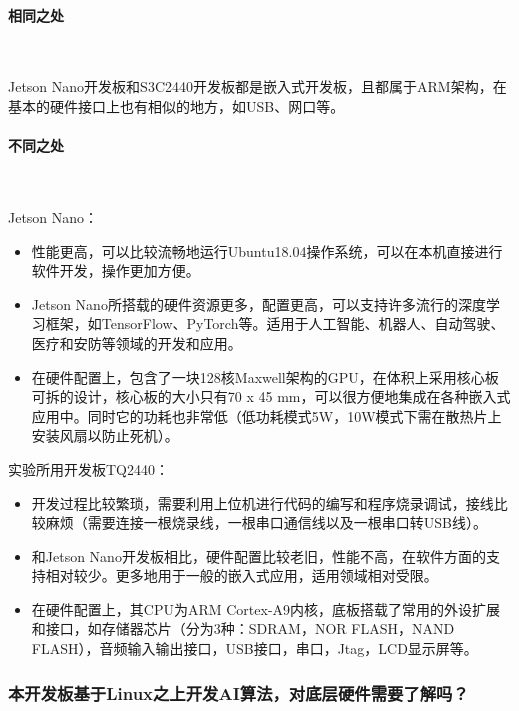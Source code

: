 \documentclass[UTF8]{article}
\begin{document}
\paragraph{相同之处}~{}

Jetson Nano开发板和S3C2440开发板都是嵌入式开发板，且都属于ARM架构，在基本的硬件接口上也有相似的地方，如USB、网口等。

\paragraph{不同之处}~{}

\noindent Jetson Nano：
\begin{itemize}
    \item 性能更高，可以比较流畅地运行Ubuntu18.04操作系统，可以在本机直接进行软件开发，操作更加方便。
    \item Jetson Nano所搭载的硬件资源更多，配置更高，可以支持许多流行的深度学习框架，如TensorFlow、PyTorch等。适用于人工智能、机器人、自动驾驶、医疗和安防等领域的开发和应用。
    \item 在硬件配置上，包含了一块128核Maxwell架构的GPU，在体积上采用核心板可拆的设计，核心板的大小只有70 x 45 mm，可以很方便地集成在各种嵌入式应用中。同时它的功耗也非常低（低功耗模式5W，10W模式下需在散热片上安装风扇以防止死机）。
\end{itemize}


\noindent 实验所用开发板TQ2440：
\begin{itemize}
    \item 开发过程比较繁琐，需要利用上位机进行代码的编写和程序烧录调试，接线比较麻烦（需要连接一根烧录线，一根串口通信线以及一根串口转USB线）。
    \item 和Jetson Nano开发板相比，硬件配置比较老旧，性能不高，在软件方面的支持相对较少。更多地用于一般的嵌入式应用，适用领域相对受限。
    \item 在硬件配置上，其CPU为ARM Cortex-A9内核，底板搭载了常用的外设扩展和接口，如存储器芯片（分为3种：SDRAM，NOR FLASH，NAND FLASH），音频输入输出接口，USB接口，串口，Jtag，LCD显示屏等。
\end{itemize}

\subsubsection{本开发板基于Linux之上开发AI算法，对底层硬件需要了解吗？} 
\end{document}
